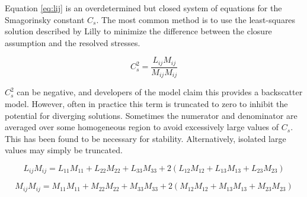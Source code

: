 \documentclass[12pt,titlepage]{article}
\begin{document}
Equation \ref{eq:lij} is an overdetermined but closed system of equations for the 
Smagorinsky constant $C_s$. The most common method is to use the
least-squares solution described by Lilly to minimize the difference
between the closure assumption and the resolved stresses.

\begin{displaymath}
C_s^2=\frac{L_{ij}M_{ij}}{M_{ij}M_{ij}}
\end{displaymath}

$C_s^2$ can be negative, and developers of the model
claim this provides a backscatter model. However, often in practice this term is
truncated to zero to inhibit the potential for diverging solutions. Sometimes the
numerator and denominator are averaged over some homogeneous region to avoid
excessively large values of $C_s$. This has been found to be necessary for stability.
Alternatively, isolated large values may simply be truncated.

\begin{displaymath}
L_{ij}M_{ij}=L_{11}M_{11}+L_{22}M_{22}+L_{33}M_{33}+2(L_{12}M_{12}+L_{13}M_{13}+L_{23}M_{23})
\end{displaymath}

\begin{displaymath}
M_{ij}M_{ij}=M_{11}M_{11}+M_{22}M_{22}+M_{33}M_{33}+2(M_{12}M_{12}+M_{13}M_{13}+M_{23}M_{23})
\end{displaymath}
\end{document}
